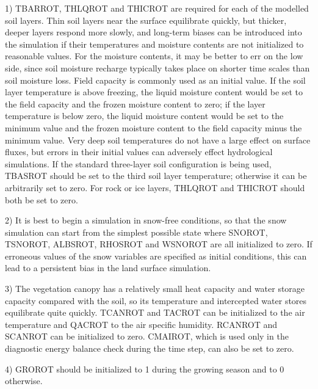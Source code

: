 1) T\+B\+A\+R\+R\+O\+T, T\+H\+L\+Q\+R\+O\+T and T\+H\+I\+C\+R\+O\+T are required for each of the modelled soil layers. Thin soil layers near the surface equilibrate quickly, but thicker, deeper layers respond more slowly, and long-\/term biases can be introduced into the simulation if their temperatures and moisture contents are not initialized to reasonable values. For the moisture contents, it may be better to err on the low side, since soil moisture recharge typically takes place on shorter time scales than soil moisture loss. Field capacity is commonly used as an initial value. If the soil layer temperature is above freezing, the liquid moisture content would be set to the field capacity and the frozen moisture content to zero; if the layer temperature is below zero, the liquid moisture content would be set to the minimum value and the frozen moisture content to the field capacity minus the minimum value. Very deep soil temperatures do not have a large effect on surface fluxes, but errors in their initial values can adversely effect hydrological simulations. If the standard three-\/layer soil configuration is being used, T\+B\+A\+S\+R\+O\+T should be set to the third soil layer temperature; otherwise it can be arbitrarily set to zero. For rock or ice layers, T\+H\+L\+Q\+R\+O\+T and T\+H\+I\+C\+R\+O\+T should both be set to zero.

2) It is best to begin a simulation in snow-\/free conditions, so that the snow simulation can start from the simplest possible state where S\+N\+O\+R\+O\+T, T\+S\+N\+O\+R\+O\+T, A\+L\+B\+S\+R\+O\+T, R\+H\+O\+S\+R\+O\+T and W\+S\+N\+O\+R\+O\+T are all initialized to zero. If erroneous values of the snow variables are specified as initial conditions, this can lead to a persistent bias in the land surface simulation.

3) The vegetation canopy has a relatively small heat capacity and water storage capacity compared with the soil, so its temperature and intercepted water stores equilibrate quite quickly. T\+C\+A\+N\+R\+O\+T and T\+A\+C\+R\+O\+T can be initialized to the air temperature and Q\+A\+C\+R\+O\+T to the air specific humidity. R\+C\+A\+N\+R\+O\+T and S\+C\+A\+N\+R\+O\+T can be initialized to zero. C\+M\+A\+I\+R\+O\+T, which is used only in the diagnostic energy balance check during the time step, can also be set to zero.

4) G\+R\+O\+R\+O\+T should be initialized to 1 during the growing season and to 0 otherwise.

